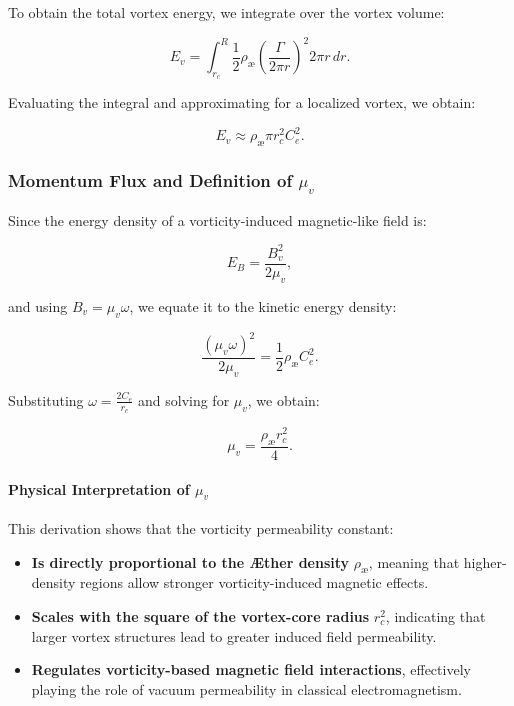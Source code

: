 To obtain the total vortex energy, we integrate over the vortex volume:

\begin{equation*}
    E_v = \int_{r_c}^{R} \frac{1}{2} \rho_\text{\ae} \left( \frac{\Gamma}{2\pi r} \right)^2 2\pi r \, dr.
\end{equation*}

Evaluating the integral and approximating for a localized vortex, we obtain:

\begin{equation*}
    E_v \approx \rho_\text{\ae} \pi r_c^2 C_e^2.
\end{equation*}

\subsubsection*{Momentum Flux and Definition of \( \mu_v \)}
Since the energy density of a vorticity-induced magnetic-like field is:

\begin{equation*}
    E_B = \frac{B_v^2}{2\mu_v},
\end{equation*}

and using \( B_v = \mu_v \omega \), we equate it to the kinetic energy density:

\begin{equation*}
    \frac{(\mu_v \omega)^2}{2\mu_v} = \frac{1}{2} \rho_\text{\ae} C_e^2.
\end{equation*}

Substituting \( \omega = \frac{2C_e}{r_c} \) and solving for \( \mu_v \), we obtain:

\begin{equation*}
    \mu_v = \frac{\rho_\text{\ae} r_c^2}{4}.
\end{equation*}

\paragraph*{Physical Interpretation of \( \mu_v \)}
This derivation shows that the vorticity permeability constant:

\begin{itemize}
    \item \textbf{Is directly proportional to the Æther density} \( \rho_\text{\ae} \), meaning that higher-density regions allow stronger vorticity-induced magnetic effects.
    \item \textbf{Scales with the square of the vortex-core radius} \( r_c^2 \), indicating that larger vortex structures lead to greater induced field permeability.
    \item \textbf{Regulates vorticity-based magnetic field interactions}, effectively playing the role of vacuum permeability in classical electromagnetism.
\end{itemize}

